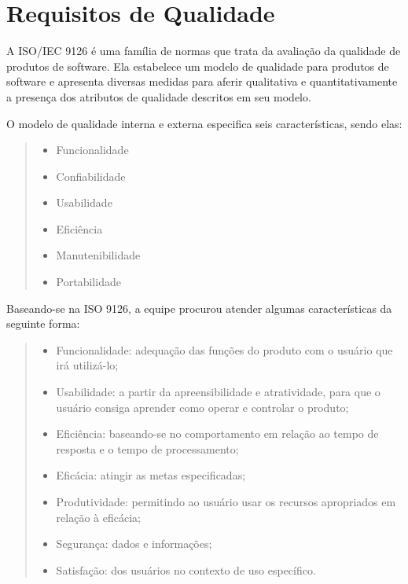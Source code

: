\section[Requisitos de Qualidade]{Requisitos de Qualidade}
A ISO/IEC 9126 é uma família de normas que trata da avaliação da qualidade de
produtos de software. Ela estabelece um modelo de qualidade para produtos de software e
apresenta diversas medidas para aferir qualitativa e quantitativamente a presença dos atributos
de qualidade descritos em seu modelo. 

O modelo de qualidade interna e externa especifica seis características, sendo elas:
\begin{quote} 
	\begin{itemize}
        \item Funcionalidade
		\item Confiabilidade
		\item Usabilidade
		\item Eficiência
		\item Manutenibilidade
		\item Portabilidade
    \end{itemize}
\end{quote}

Baseando-se na ISO 9126, a equipe procurou atender algumas características da seguinte forma:
\begin{quote} 
	\begin{itemize}
        \item Funcionalidade: adequação das funções do produto com o usuário que irá utilizá-lo;
        \item Usabilidade: a partir da apreensibilidade e atratividade, para que o usuário consiga aprender como operar e controlar o produto;
        \item Eficiência: baseando-se no comportamento em relação ao tempo de resposta e o tempo de processamento;
        \item Eficácia: atingir as metas especificadas;
        \item Produtividade: permitindo ao usuário usar os recursos apropriados em relação à eficácia;
        \item Segurança: dados e informações;
        \item Satisfação: dos usuários no contexto de uso específico.
    \end{itemize}
\end{quote}